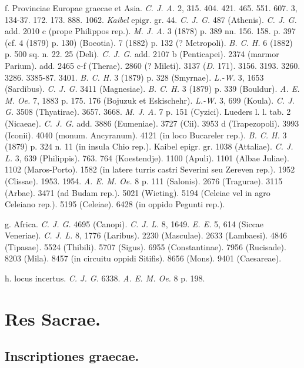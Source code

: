 \documentclass[a4paper, 11pt, oneside, polutonikogreek, german]{article}
\begin{document}
f. Provinciae Europae graecae et Asia. \emph{C. J. A.} 2, 315. 404. 421. 465. 551. 607. 3, 134-37. 172. 173. 888. 1062. \emph{Kaibel} epigr. gr. 44. \emph{C. J. G.} 487 (Athenis). \emph{C. J. G.} add. 2010 c (prope Philippos rep.). \emph{M. J. A.} 3 (1878) p. 389 nn. 156. 158. p. 397 (cf. 4 (1879) p. 130) (Boeotia). 7 (1882) p. 132 (? Metropoli). \emph{B. C. H.} 6 (1882) p. 500 sq. n. 22. 25 (Deli). \emph{C. J. G.} add. 2107 b (Penticapei). 2374 (marmor Parium). add. 2465 c-f (Therae). 2860 (? Mileti). 3137 (\emph{D.} 171). 3156. 3193. 3260. 3286. 3385-87. 3401. \emph{B. C. H.} 3 (1879) p. 328 (Smyrnae). \emph{L.-W.} 3, 1653 (Sardibus). \emph{C. J. G.} 3411 (Magnesiae). \emph{B. C. H.} 3 (1879) p. 339 (Bouldur). \emph{A. E. M. Oe.} 7, 1883 p. 175. 176 (Bojuzuk et Eskischehr). \emph{L.-W.} 3, 699 (Koula). \emph{C. J. G.} 3508 (Thyatirae). 3657. 3668. \emph{M. J. A.} 7 p. 151 (Cyzici). Lueders l. l. tab. 2 (Nicaeae). \emph{C. J. G.} add. 3886 (Eumeniae). 3727 (Cii). 3953 d (Trapezopoli). 3993 (Iconii). 4040 (monum. Ancyranum). 4121 (in loco Bucareler rep.). \emph{B. C. H.} 3 (1879) p. 324 n. 11 (in insula Chio rep.). Kaibel epigr. gr. 1038 (Attaliae). \emph{C. J. L.} 3, 639 (Philippis). 763. 764 (Koestendje). 1100 (Apuli). 1101 (Albae Juliae). 1102 (Maros-Porto). 1582 (in latere turris castri Severini seu Zereven rep.). 1952 (Clissae). 1953. 1954. \emph{A. E. M. Oe.} 8 p. 111 (Salonis). 2676 (Tragurae). 3115 (Arbae). 3471 (ad Budam rep.). 5021 (Wieting). 5194 (Celeiae vel in agro Celeiano rep.). 5195 (Celeiae). 6428 (in oppido Pegunti rep.).

g. Africa. \emph{C. J. G.} 4695 (Canopi). \emph{C. J. L.} 8, 1649. \emph{E. E.} 5, 614 (Siccae Veneriae). \emph{C. J. L.} 8, 1776 (Laribus). 2230 (Masculae). 2633 (Lambaesi). 4846 (Tipasae). 5524 (Thibili). 5707 (Sigus). 6955 (Constantinae). 7956 (Rucisade). 8203 (Mila). 8457 (in circuitu oppidi Sitifis). 8656 (Mons). 9401 (Caesareae).

h. locus incertus. \emph{C. J. G.} 6338. \emph{A. E. M. Oe.} 8 p. 198.
\clearpage
\section{Res Sacrae.}
\subsection{Inscriptiones graecae.}
\end{document}
